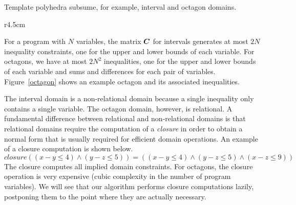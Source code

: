 Template polyhedra subsume, for example, interval and octagon domains.

\begin{wrapfigure}{r}{4.5cm}
\vspace*{-3ex}
\caption{An example of Octagon}\label{octagon}
\vspace*{-3ex}
\end{wrapfigure} 

For a program with $N$ variables, the matrix ${\boldsymbol C}$ for intervals
generates at most $2N$ inequality constraints, one for the upper and lower
bounds of each variable.
%
For octagons, we have at most $2N^2$ inequalities, one for the upper
and lower bounds of each variable and sums and differences for each
pair of variables. Figure~\ref{octagon} shows an 
example octagon and its associated inequalities.   

The interval domain is a non-relational domain because a single
inequality only contains a single variable.
%
The octagon domain, however, is relational.  A fundamental difference
between relational and non-relational domains is that relational
domains require the computation of a \emph{closure} in order to obtain
a normal form that is usually required for efficient domain operations.
An example of a closure computation is shown below.
\[\mathit{closure}((x-y \leq 4) \wedge (y-z \leq 5))=((x-y \leq 4) \wedge (y-z \leq 5) \wedge (x-z \leq 9)) \]  
The closure computes all implied domain constraints.  For octagons,
the closure operation is very expensive (cubic complexity in the
number of program variables).
%
We will see that our algorithm performs closure computations lazily,
postponing them to the point where they are actually necessary.

